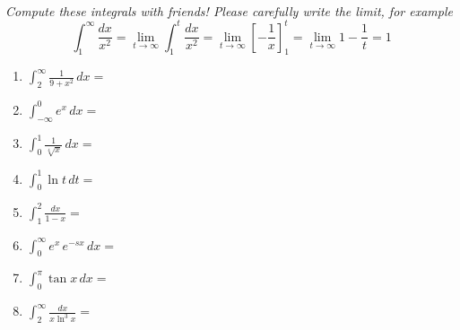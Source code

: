 \documentclass[11pt,fleqn]{article}
\newcommand{\ds}{\displaystyle}
\begin{document}
\renewcommand{\headrulewidth}{0pt}
\newcommand{\blank}[1]{\rule{#1}{0.75pt}}
\newcommand{\bc}{\begin{center}}
\newcommand{\ec}{\end{center}}


\vspace*{-0.7in}

\begin{center}
  \large
  \\
   
\end{center}


\emph{Compute these integrals with friends!  Please carefully write the limit, for example}
    $$\int_1^\infty \frac{dx}{x^2} = \lim_{t\to \infty} \int_1^t \frac{dx}{x^2} = \lim_{t\to \infty} \left[-\frac{1}{x}\right]_1^t = \lim_{t\to \infty} 1 - \frac{1}{t} = 1$$



\begin{enumerate}
\item  $\ds \int_2^\infty \frac{1}{9+x^2}\,dx =$
\vfill

\item  $\ds \int_{-\infty}^0 e^x\,dx =$
\vfill

\item   $\ds \int_0^1 \frac{1}{\sqrt[4]{x}}\,dx =$
\vfill

\item   $\ds \int_0^1 \ln t\,dt =$
\vfill

\clearpage\newpage
\item  $\ds \int_1^2 \frac{dx}{1-x} =$
\vfill

\item   $\ds \int_0^\infty e^x \,e^{-s x}\,dx =$
\vfill

\item   $\ds \int_0^\pi \tan x\,dx =$
\vfill

\item   $\ds \int_2^\infty \frac{dx}{x \ln^3 x} =$
\vspace{3.0in}
\end{enumerate}
\end{document}
